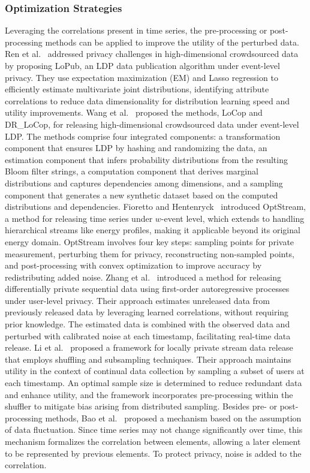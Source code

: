 \subsubsection{Optimization Strategies}
Leveraging the correlations present in time series, the pre-processing or post-processing methods can be applied to improve the utility of the perturbed data.
Ren et al.~\cite{ren2018textsf} addressed privacy challenges in high-dimensional crowdsourced data by proposing LoPub, an LDP data publication algorithm under event-level privacy. They use expectation maximization (EM) and Lasso regression to efficiently estimate multivariate joint distributions, identifying attribute correlations to reduce data dimensionality for distribution learning speed and utility improvements.
Wang et al.~\cite{wang2019locally} proposed the methods, LoCop and DR\_LoCop, for releasing high-dimensional crowdsourced data under event-level LDP. The methods comprise four integrated components: a transformation component that ensures LDP by hashing and randomizing the data, an estimation component that infers probability distributions from the resulting Bloom filter strings, a computation component that derives marginal distributions and captures dependencies among dimensions, and a sampling component that generates a new synthetic dataset based on the computed distributions and dependencies. 
Fioretto and Hentenryck~\cite{fioretto2019optstream} introduced OptStream,  a method for releasing time series under $w$-event level, which extends to handling hierarchical streams like energy profiles, making it applicable beyond its original energy domain. OptStream involves four key steps: sampling points for private measurement, perturbing them for privacy, reconstructing non-sampled points, and post-processing with convex optimization to improve accuracy by redistributing added noise.
Zhang et al.~\cite{zhang2022differentially} introduced a method for releasing differentially private sequential data using first-order autoregressive processes under user-level privacy. Their approach estimates unreleased data from previously released data by leveraging learned correlations, without requiring prior knowledge. The estimated data is combined with the observed data and perturbed with calibrated noise at each timestamp, facilitating real-time data release.
Li et al.~\cite{li2023locally} proposed a framework for locally private stream data release that employs shuffling and subsampling techniques. Their approach maintains utility in the context of continual data collection by sampling a subset of users at each timestamp. An optimal sample size is determined to reduce redundant data and enhance utility, and the framework incorporates pre-processing within the shuffler to mitigate bias arising from distributed sampling. 
Besides pre- or post-processing methods, Bao et al.~\cite{bao2021cgm} proposed a mechanism based on the assumption of data fluctuation. Since time series may not change significantly over time, this mechanism formalizes the correlation between elements, allowing a later element to be represented by previous elements. To protect privacy, noise is added to the correlation.

